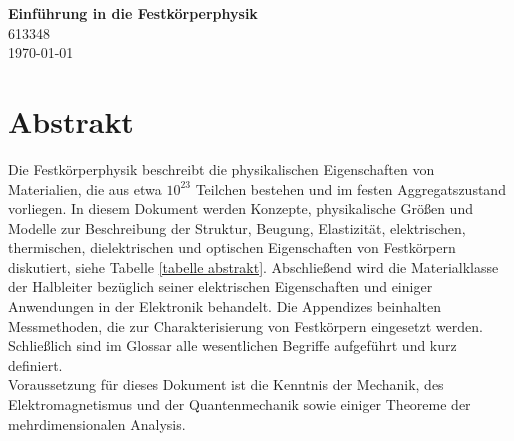\documentclass{article}
\begin{document}
\begin{center}
	\Large{\textbf{Einführung in die Festkörperphysik}}\\
	\small{613348}\\
	\small{\today}
\end{center}

{\scriptsize\tableofcontents}


\newpage


\section*{Abstrakt}
Die Festkörperphysik beschreibt die physikalischen Eigenschaften von Materialien, die aus etwa $10^{23}$ Teilchen bestehen und im festen Aggregatszustand vorliegen. In diesem Dokument werden Konzepte, physikalische Größen und Modelle zur Beschreibung der Struktur, Beugung, Elastizität, elektrischen, thermischen, dielektrischen und optischen Eigenschaften von Festkörpern diskutiert, siehe Tabelle \ref{tabelle abstrakt}. Abschließend wird die Materialklasse der Halbleiter bezüglich seiner elektrischen Eigenschaften und einiger Anwendungen in der Elektronik behandelt. Die Appendizes beinhalten Messmethoden, die zur Charakterisierung von Festkörpern eingesetzt werden. Schließlich sind im Glossar alle wesentlichen Begriffe aufgeführt und kurz definiert. \\
Voraussetzung für dieses Dokument ist die Kenntnis der Mechanik, des Elektromagnetismus und der Quantenmechanik sowie einiger Theoreme der mehrdimensionalen Analysis.
\end{document}
